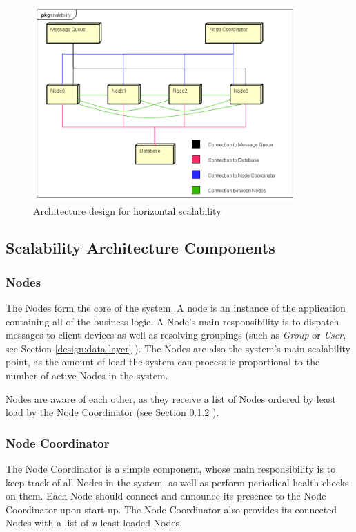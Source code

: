 \begin{figure}[!ht]
	\centering
	\includegraphics[width=0.9\textwidth]{figures/03_design/scalability-architecture}
    \caption{Architecture design for horizontal scalability}
    \label{fig:scalability-architecture}
\end{figure}

\subsection{Scalability Architecture Components}
\subsubsection{Nodes}
The Nodes form the core of the system. A node is an instance of the application containing all of the business logic. A Node's main responsibility is to dispatch messages to client devices as well as resolving groupings (such as \textit{Group} or \textit{User}, see Section \ref{design:data-layer} ). The Nodes are also the system's main scalability point, as the amount of load the system can process is proportional to the number of active Nodes in the system.

Nodes are aware of each other, as they receive a list of Nodes ordered by least load by the Node Coordinator (see Section \ref{design:node-coordinator} ).

\subsubsection{Node Coordinator} \label{design:node-coordinator}
The Node Coordinator is a simple component, whose main responsibility is to keep track of all Nodes in the system, as well as perform periodical health checks on them. Each Node should connect and announce its presence to the Node Coordinator upon start-up. The Node Coordinator also provides its connected Nodes with a list of \textit{n} least loaded Nodes.

